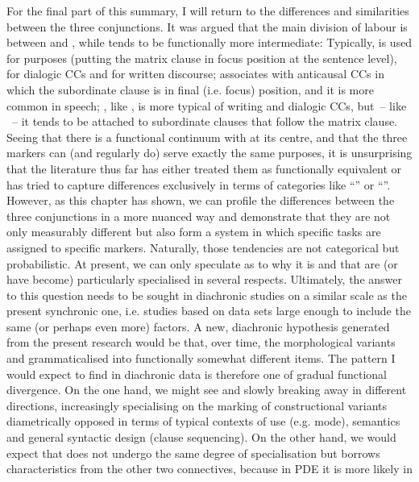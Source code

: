 For the final part of this summary, I will return to the differences and similarities between the three conjunctions. It was argued that the main division of labour is between  and , while  tends to be functionally more intermediate: Typically,  is used for  purposes (putting the matrix clause in focus position at the sentence level), for dialogic CCs and for written discourse;  associates with anticausal CCs in which the subordinate clause is in final (i.e. focus) position, and it is more common in speech; , like , is more typical of writing and dialogic CCs, but~– like ~– it tends to be attached to subordinate clauses that follow the matrix clause. Seeing that there is a functional continuum with  at its centre, and that the three markers can (and regularly do) serve exactly the same purposes, it is unsurprising that the literature thus far has either treated them as functionally equivalent or has tried to capture differences exclusively in terms of categories like “” or “”. However, as this chapter has shown, we can profile the differences between the three conjunctions in a more nuanced way and demonstrate that they are not only measurably different but also form a system in which specific tasks are assigned to specific markers. Naturally, those tendencies are not categorical but probabilistic. At present, we can only speculate as to why it is  and  that are (or have become) particularly specialised in several respects. Ultimately, the answer to this question needs to be sought in diachronic studies on a similar scale as the present synchronic one, i.e. studies based on data sets large enough to include the same (or perhaps even more) factors. A new, diachronic hypothesis generated from the present research would be that, over time, the morphological variants  and  grammaticalised into functionally somewhat different items. The pattern I would expect to find in diachronic data is therefore one of gradual functional divergence. On the one hand, we might see  and  slowly breaking away in different directions, increasingly specialising on the marking of constructional variants diametrically opposed in terms of typical contexts of use (e.g. mode), semantics and general syntactic design (clause sequencing). On the other hand, we would expect that  does not undergo the same degree of specialisation but borrows characteristics from the other two connectives, because in PDE it is more likely in 